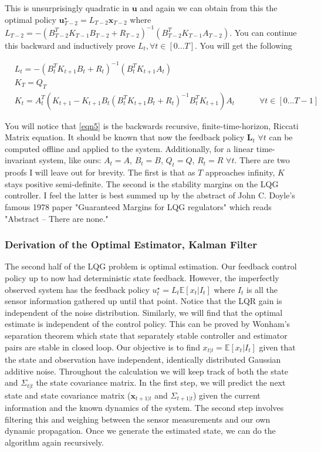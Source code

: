 \documentclass[conf]{new-aiaa}
\begin{document}
\begin{doublespace}
This is unsurprisingly quadratic in $\mathbf{u}$ and again we can obtain from this the optimal policy $\mathbf{u}_{T-2}^\star = L_{T-2}\mathbf{x}_{T-2}$ where $L_{T-2} = -(B_{T-2}^TK_{T-1}B_{T-2} + R_{T-2})^{-1}(B_{T-2}^TK_{T-1}A_{T-2})$. You can continue this backward and inductively prove $L_t, \forall t \in [0 ... T]$. You will get the following
\begin{singlespace}
\begin{align}
& L_{t} = -(B_{t}^TK_{t+1}B_{t} + R_{t})^{-1}(B_{t}^TK_{t+1}A_{t}) \\
& K_T = Q_T\\
& K_t = A_{t}^T (K_{t+1} - K_{t+1}B_{t}(B_{t}^TK_{t+1}B_{t} + R_{t})^{-1}B_{t}^TK_{t+1})A_{t}  \quad \quad \quad \forall t \in [0 ... T-1] \label{eqn5}
\end{align}
\end{singlespace}

You will notice that \ref{eqn5} is the backwards recursive, finite-time-horizon, Riccati Matrix equation. It should be known that now the feedback policy $\mathbf{L}_t$ $\forall t$ can be computed offline and applied to the system. Additionally, for a linear time-invariant system, like ours: $A_t = A$, $B_t = B$, $Q_t = Q$, $R_t = R$ $\forall t$. There are two proofs I will leave out for brevity. The first is that as $T$ approaches infinity, $K$ stays positive semi-definite. The second is the stability margins on the LQG controller. I feel the latter is best summed up by the abstract of John C. Doyle's famous 1978 paper "Guaranteed Margins for LQG regulators" which reads "Abstract -- There are none."

\subsubsection{Derivation of the Optimal Estimator, Kalman Filter}
The second half of the LQG problem is optimal estimation. Our feedback control policy up to now had deterministic state feedback. However, the imperfectly observed system has the feedback policy $u_t^\star = L_t\mathbb{E}[x_t|I_t]$ where $I_t$ is all the sensor information gathered up until that point. Notice that the LQR gain is independent of the noise distribution. Similarly, we will find that the optimal estimate is independent of the control policy. This can be proved by Wonham's separation theorem which state that separately stable controller and estimator pairs are stable in closed loop. Our objective is to find $x_{t|t}=\mathbb{E}[x_t|I_t]$ given that the state and observation have independent, identically distributed Gaussian additive noise. Throughout the calculation we will keep track of both the state and $\Sigma_{t|t}$ the state covariance matrix. In the first step, we will predict the next state and state covariance matrix ($\mathbf{x}_{t+1|t}$ and $\Sigma_{t+1|t}$) given the current information and the known dynamics of the system. The second step involves filtering this and weighing between the sensor measurements and our own dynamic propagation. Once we generate the estimated state, we can do the algorithm again recursively.


\end{doublespace}
\end{document}
